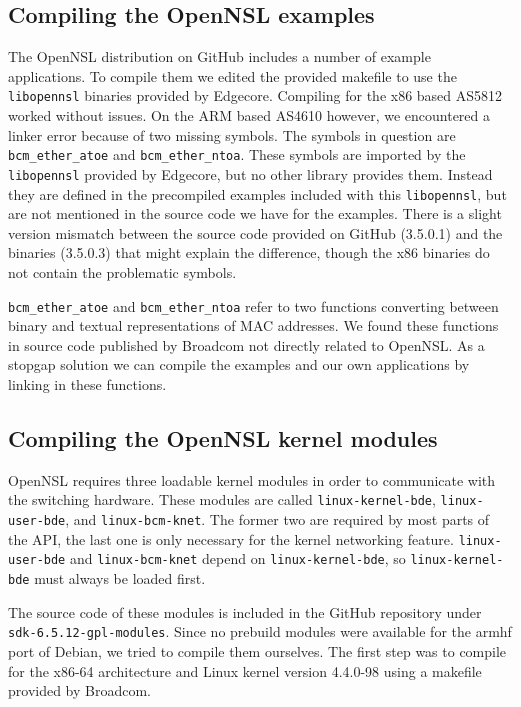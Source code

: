 \documentclass[a4paper]{article}
\begin{document}
\subsection{Compiling the OpenNSL examples}
The OpenNSL distribution on GitHub includes a number of example applications. To compile them we edited the provided makefile to use the \texttt{libopennsl} binaries provided by Edgecore. Compiling for the x86 based AS5812 worked without issues. On the ARM based AS4610 however, we encountered a linker error because of two missing symbols. The symbols in question are \texttt{bcm\_ether\_atoe} and \texttt{bcm\_ether\_ntoa}. These symbols are imported by the \texttt{libopennsl} provided by Edgecore, but no other library provides them. Instead they are defined in the precompiled examples included with this \texttt{libopennsl}, but are not mentioned in the source code we have for the examples. There is a slight version mismatch between the source code provided on GitHub (3.5.0.1) and the binaries (3.5.0.3) that might explain the difference, though the x86 binaries do not contain the problematic symbols.

\texttt{bcm\_ether\_atoe} and \texttt{bcm\_ether\_ntoa} refer to two functions converting between binary and textual representations of MAC addresses. We found these functions in source code published by Broadcom not directly related to OpenNSL. As a stopgap solution we can compile the examples and our own applications by linking in these functions.


\subsection{Compiling the OpenNSL kernel modules} \label{sec:kernel_modules}
OpenNSL requires three loadable kernel modules in order to communicate with the switching hardware. These modules are called \texttt{linux-kernel-bde}, \texttt{linux-user-bde}, and \texttt{linux-bcm-knet}. The former two are required by most parts of the API, the last one is only necessary for the kernel networking feature. \texttt{linux-user-bde} and \texttt{linux-bcm-knet} depend on \texttt{linux-kernel-bde}, so \texttt{linux-kernel-bde} must always be loaded first.

The source code of these modules is included in the GitHub repository under \texttt{sdk-6.5.12-gpl-modules}. Since no prebuild modules were available for the armhf port of Debian, we tried to compile them ourselves. The first step was to compile for the x86-64 architecture and Linux kernel version 4.4.0-98 using a makefile provided by Broadcom.
\end{document}
